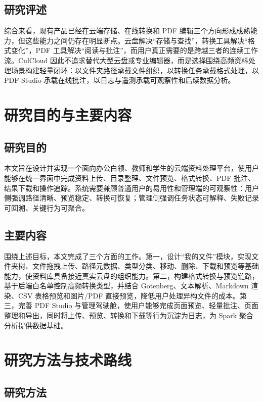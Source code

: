 \subsection{研究评述}

综合来看，现有产品已经在云端存储、在线转换和 PDF 编辑三个方向形成成熟能力，但这些能力之间仍存在明显断点。云盘解决“存储与查找”，转换工具解决“格式变化”，PDF 工具解决“阅读与批注”，而用户真正需要的是跨越三者的连续工作流。CulCloud 因此不追求替代大型云盘或专业编辑器，而是选择围绕高频资料处理场景构建轻量闭环：以文件夹路径承载文件组织，以转换任务承载格式处理，以 PDF Studio 承载在线批注，以日志与遥测承载可观察性和后续数据分析。

\section{研究目的与主要内容}

\subsection{研究目的}

本文旨在设计并实现一个面向办公白领、教师和学生的云端资料处理平台，使用户能够在统一界面中完成资料上传、目录整理、文件预览、格式转换、PDF 批注、结果下载和操作追踪。系统需要兼顾普通用户的易用性和管理端的可观察性：用户侧强调路径清晰、预览稳定、转换可恢复；管理侧强调任务状态可解释、失败记录可回溯、关键行为可聚合。

\subsection{主要内容}

围绕上述目标，本文完成了三个方面的工作。第一，设计“我的文件”模块，实现文件夹树、文件拖拽上传、路径元数据、类型分类、移动、删除、下载和预览等基础能力，使资料库具备接近真实云盘的组织能力。第二，构建格式转换与预览链路，基于后端白名单控制高频转换类型，并结合 Gotenberg、文本解析、Markdown 渲染、CSV 表格预览和图片/PDF 直接预览，降低用户处理异构文件的成本。第三，完善 PDF Studio 与管理驾驶舱，使用户能够完成页面预览、轻量批注、页面整理和导出，同时将上传、预览、转换和下载等行为沉淀为日志，为 Spark 聚合分析提供数据基础。

\section{研究方法与技术路线}

\subsection{研究方法}

